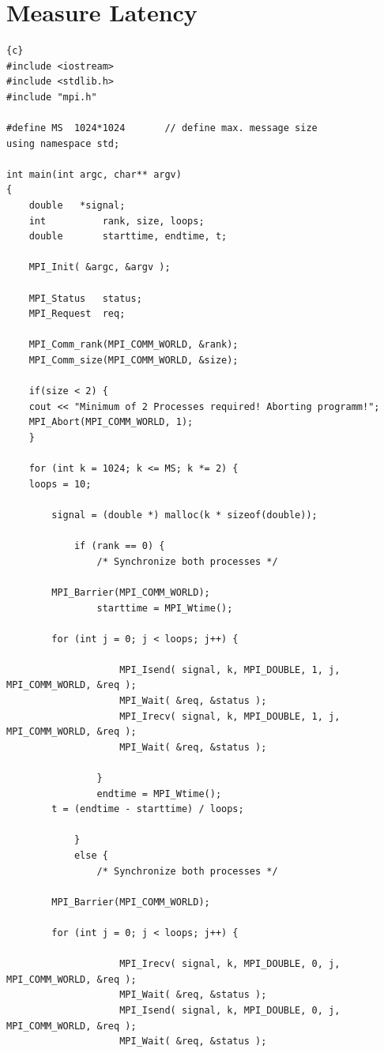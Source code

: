 \documentclass{article}
\newcommand{\enterProblemHeader}[1]{
}
\newcommand{\exitProblemHeader}[1]{
}
\newcounter{homeworkProblemCounter} %
\newcommand{\homeworkProblemName}{}
\newenvironment{homeworkProblem}[1][Problem \arabic{homeworkProblemCounter}]{ %
\stepcounter{homeworkProblemCounter} %
\renewcommand{\homeworkProblemName}{#1} %
\section{\homeworkProblemName} %
}{
}
\begin{document}
\begin{homeworkProblem}[Measure Latency]
\begin{lstlisting}{c}
#include <iostream>
#include <stdlib.h>
#include "mpi.h"

#define MS 	1024*1024		// define max. message size
using namespace std;

int main(int argc, char** argv)
{
    double 	 *signal;
    int          rank, size, loops;
    double       starttime, endtime, t;
   
    MPI_Init( &argc, &argv );
	
    MPI_Status   status;
    MPI_Request  req;

    MPI_Comm_rank(MPI_COMM_WORLD, &rank);
    MPI_Comm_size(MPI_COMM_WORLD, &size);

    if(size < 2) {
	cout << "Minimum of 2 Processes required! Aborting programm!";
	MPI_Abort(MPI_COMM_WORLD, 1);
    }

    for (int k = 1024; k <= MS; k *= 2) {
	loops = 10;

        signal = (double *) malloc(k * sizeof(double));

            if (rank == 0) {
                /* Synchronize both processes */
		
		MPI_Barrier(MPI_COMM_WORLD); 
                starttime = MPI_Wtime();
                
		for (int j = 0; j < loops; j++) {
		  
                    MPI_Isend( signal, k, MPI_DOUBLE, 1, j, MPI_COMM_WORLD, &req );
                    MPI_Wait( &req, &status );
                    MPI_Irecv( signal, k, MPI_DOUBLE, 1, j, MPI_COMM_WORLD, &req );
                    MPI_Wait( &req, &status );
		    
                }
                endtime = MPI_Wtime();
		t = (endtime - starttime) / loops;
                
            }
            else {
                /* Synchronize both processes */
		
		MPI_Barrier(MPI_COMM_WORLD);
                
		for (int j = 0; j < loops; j++) {
		  
                    MPI_Irecv( signal, k, MPI_DOUBLE, 0, j, MPI_COMM_WORLD, &req );
                    MPI_Wait( &req, &status );
                    MPI_Isend( signal, k, MPI_DOUBLE, 0, j, MPI_COMM_WORLD, &req );
                    MPI_Wait( &req, &status );
		    

\end{lstlisting}
\end{homeworkProblem}
\end{document}
